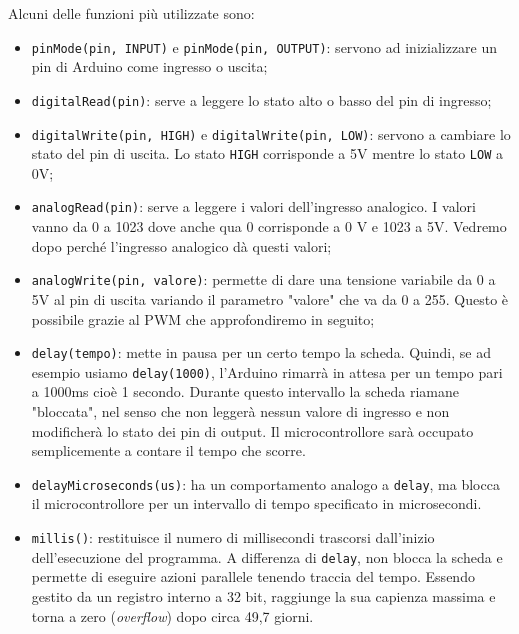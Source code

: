 \documentclass[12pt, letterpaper]{book}
\begin{document}
    Alcuni delle funzioni più utilizzate sono:
    \begin{itemize}[leftmargin=1.2cm, itemsep=1pt, topsep=5pt]
      \item \lstinline[style=myArduino]{pinMode(pin, INPUT)} e \lstinline[style=myArduino]{pinMode(pin, OUTPUT)}: servono ad inizializzare un pin di Arduino come ingresso o uscita;
      \item \lstinline[style=myArduino]{digitalRead(pin)}: serve a leggere lo stato alto o basso del pin di ingresso;
      \item \lstinline[style=myArduino]{digitalWrite(pin, HIGH)} e \lstinline[style=myArduino]{digitalWrite(pin, LOW)}: servono a cambiare lo stato del pin di uscita. Lo stato \lstinline[style=myArduino]{HIGH} corrisponde a 5V mentre lo stato \lstinline[style=myArduino]{LOW} a 0V;
      \item \lstinline[style=myArduino]{analogRead(pin)}: serve a leggere i valori dell'ingresso analogico. I valori vanno da 0 a 1023 dove anche qua 0 corrisponde a 0 V e 1023 a 5V. Vedremo dopo perché l'ingresso analogico dà questi valori;
      \item \lstinline[style=myArduino]{analogWrite(pin, valore)}: permette di dare una tensione variabile da 0 a 5V al pin di uscita variando il parametro "valore" che va da 0 a 255. Questo è possibile grazie al PWM che approfondiremo in seguito;
      \item \lstinline[style=myArduino]{delay(tempo)}: mette in pausa per un certo tempo la scheda. Quindi, se ad esempio usiamo \lstinline[style=myArduino]{delay(1000)}, l'Arduino rimarrà in attesa per un tempo pari a 1000ms cioè 1 secondo. Durante questo intervallo la scheda riamane "bloccata", nel senso che non leggerà nessun valore di ingresso e non modificherà lo stato dei pin di output. Il microcontrollore sarà occupato semplicemente a contare il tempo che scorre. 
      \item \lstinline[style=myArduino]{delayMicroseconds(us)}: ha un comportamento analogo a \texttt{delay}, ma blocca il microcontrollore per un intervallo di tempo specificato in microsecondi.
      \item \lstinline[style=myArduino]{millis()}: restituisce il numero di millisecondi trascorsi dall'inizio dell'esecuzione del programma. A differenza di \texttt{delay}, non blocca la scheda e permette di eseguire azioni parallele tenendo traccia del tempo. Essendo gestito da un registro interno a 32 bit, raggiunge la sua capienza massima e torna a zero (\textit{overflow}) dopo circa 49,7 giorni.
    \end{itemize}
\end{document}
